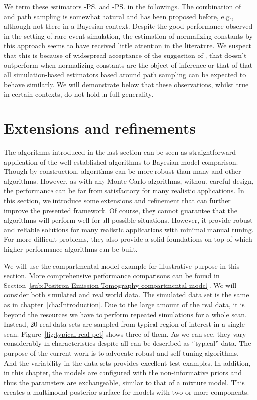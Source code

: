 We term these estimators \smc[2]-\ps and \smc[3]-\ps in the followings. The
combination of \smc and path sampling is somewhat natural and has been
proposed before, e.g., \cite{Johansen:2006wm} although not there in a Bayesian
context. Despite the good performance observed in the setting of rare
event simulation, the estimation of normalizing constants by this approach
seems to have received little attention in the literature. We suspect that
this is because of widespread acceptance of the suggestion of
\cite{DelMoral:2006hc}, that \smc doesn't outperform \ais when normalizing
constants are the object of inference or that of \cite{Calderhead:2009bd}
that all simulation-based estimators based around path sampling can be
expected to behave similarly. We will demonstrate below that these
observations, whilst true in certain contexts, do not hold in full generality.

\section{Extensions and refinements}
\label{sec:Extensions and refinements}

The algorithms introduced in the last section can be seen as straightforward
application of the well established \smc algorithms to Bayesian model
comparison. Though by construction, \smc algorithms can be more robust than
many \mcmc and other algorithms. However, as with any Monte Carlo algorithms,
without careful design, the performance can be far from satisfactory for many
realistic applications. In this section, we introduce some extensions and
refinement that can further improve the presented framework. Of course, they
cannot guarantee that the algorithms will perform well for all possible
situations. However, it provide robust and reliable solutions for many
realistic applications with minimal manual tuning. For more difficult
problems, they also provide a solid foundations on top of which higher
performance algorithms can be built.

We will use the \pet compartmental model example for illustrative purpose in
this section. More comprehensive performance comparisons can be found in
Section~\ref{sub:Positron Emission Tomography compartmental model}. We will
consider both simulated and real world data. The simulated data set is the
same as in chapter~\ref{cha:Introduction}. Due to the large amount of the real
data, it is beyond the resources we have to perform repeated simulations for a
whole \pet scan. Instead, 20 real data sets are sampled from typical region of
interest in a single \pet scan. Figure~\ref{fig:typical real pet} shows three
of them. As we can see, they vary considerably in characteristics despite
all can be described as ``typical'' \pet data. The purpose of the current work
is to advocate robust and self-tuning algorithms. And the variability in the
data sets provides excellent test examples. In addition, in this chapter, the
models are configured with the non-informative priors and thus the parameters
are exchangeable, similar to that of a mixture model. This creates a
multimodal posterior surface for models with two or more components.

